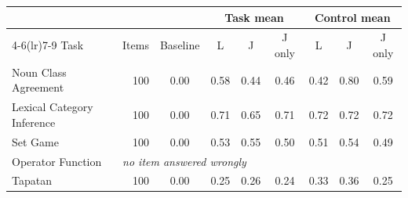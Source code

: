 \begin{tabular}{@{}lrccccccc@{}}
\toprule
 & & & \multicolumn{3}{c}{Task mean} & \multicolumn{3}{c}{Control mean} \\
\cmidrule(lr){4-6}\cmidrule(lr){7-9}
Task & Items & Baseline & L & J & J only & L & J & J only \\
\midrule
Noun Class Agreement & 100 & 0.00 & 0.58 & 0.44 & 0.46 & 0.42 & 0.80 & 0.59 \\
Lexical Category Inference & 100 & 0.00 & 0.71 & 0.65 & 0.71 & 0.72 & 0.72 & 0.72 \\
Set Game & 100 & 0.00 & 0.53 & 0.55 & 0.50 & 0.51 & 0.54 & 0.49 \\
Operator Function & \multicolumn{8}{l}{\textit{no item answered wrongly}} \\
Tapatan & 100 & 0.00 & 0.25 & 0.26 & 0.24 & 0.33 & 0.36 & 0.25 \\
\bottomrule
\end{tabular}

